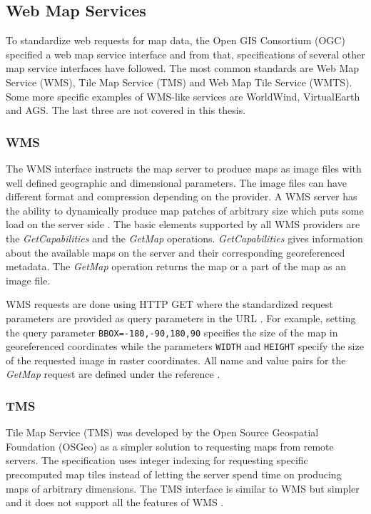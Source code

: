 \subsection{Web Map Services}

To standardize web requests for map data, the Open GIS Consortium (OGC) specified a web map service interface \cite{wms06} and from that, specifications of several other map service interfaces have followed. The most common standards are Web Map Service (WMS), Tile Map Service (TMS) and Web Map Tile Service (WMTS). Some more specific examples of WMS-like services are WorldWind, VirtualEarth and AGS. The last three are not covered in this thesis.

\subsubsection{WMS}

The WMS interface instructs the map server to produce maps as image files with well defined geographic and dimensional parameters. The image files can have different format and compression depending on the provider. A WMS server has the ability to dynamically produce map patches of arbitrary size which puts some load on the server side \cite{wms06}. The basic elements supported by all WMS providers are the \emph{GetCapabilities} and the \emph{GetMap} operations. \emph{GetCapabilities} gives information about the available maps on the server and their corresponding georeferenced metadata. The \emph{GetMap} operation returns the map or a part of the map as an image file.

WMS requests are done using HTTP GET where the standardized request parameters are provided as query parameters in the URL \cite{wms06}. For example, setting the query parameter \texttt{BBOX=-180,-90,180,90} specifies the size of the map in georeferenced coordinates while the parameters \texttt{WIDTH} and \texttt{HEIGHT} specify the size of the requested image in raster coordinates. All name and value pairs for the \emph{GetMap} request are defined under the reference \cite{wms06}.

\subsubsection{TMS}

Tile Map Service (TMS) was developed by the Open Source Geospatial Foundation (OSGeo) as a simpler solution to requesting maps from remote servers. The specification uses integer indexing for requesting specific precomputed map tiles instead of letting the server spend time on producing maps of arbitrary dimensions. The TMS interface is similar to WMS but simpler and it does not support all the features of WMS \cite{tms}.




